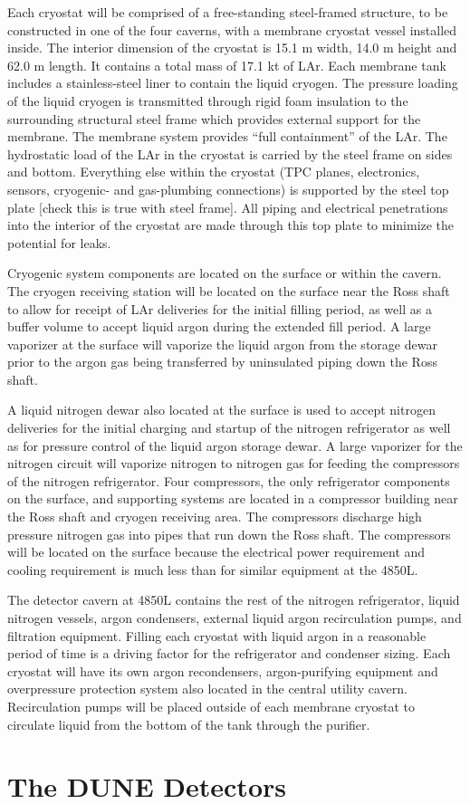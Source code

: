 Each cryostat will be comprised of a free-standing steel-framed structure, to be constructed in one of the four caverns, with a membrane cryostat vessel installed inside. The interior dimension of the cryostat is 15.1 m width, 14.0 m height and 62.0 m length. It contains a total mass of 17.1 kt of LAr. Each membrane tank includes a stainless-steel liner to contain the liquid cryogen. The pressure loading of the liquid cryogen is transmitted through rigid foam insulation to the surrounding structural steel frame which provides external support for the membrane. The membrane system provides “full containment” of the LAr. The hydrostatic load of the LAr in the cryostat is carried by the steel frame on sides and bottom. Everything else within the cryostat (TPC planes, electronics, sensors, cryogenic- and gas-plumbing connections) is supported by the steel top plate [check this is true with steel frame]. All piping and electrical penetrations into the interior of the cryostat are made through this top plate to minimize the potential for leaks.

Cryogenic system components are located on the surface or within the cavern. The cryogen receiving station will be located on the surface near the Ross shaft to allow for receipt of LAr deliveries for the initial filling period, as well as a buffer volume to accept liquid argon during the extended fill period. A large vaporizer at the surface will vaporize the liquid argon from the storage dewar prior to the argon gas being transferred by uninsulated piping down the Ross shaft. 

A liquid nitrogen dewar also located at the surface is used to accept nitrogen deliveries for the initial charging and startup of the nitrogen refrigerator as well as for pressure control of the liquid argon storage dewar. A large vaporizer for the nitrogen circuit will vaporize nitrogen to nitrogen gas for feeding the compressors of the nitrogen refrigerator. Four compressors, the only refrigerator components on the surface, and supporting systems are located in a compressor building near the Ross shaft and cryogen receiving area. The compressors discharge high pressure nitrogen gas into pipes that run down the Ross shaft. The compressors will be located on the surface because the electrical power requirement and cooling requirement is much less than for similar equipment at the 4850L.  

The detector cavern at 4850L contains the rest of the nitrogen refrigerator, liquid nitrogen vessels, argon condensers, external liquid argon recirculation pumps, and filtration equipment. Filling each cryostat with liquid argon in a reasonable period of time is a driving factor for the refrigerator and condenser sizing.  Each cryostat will have its own argon recondensers, argon-purifying equipment and overpressure protection system also located in the central utility cavern. Recirculation pumps will be placed outside of each membrane cryostat to circulate liquid from the bottom of the tank through the purifier.



\section{The DUNE Detectors}



